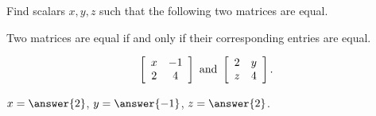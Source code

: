 \documentclass{ximera}
\author{Zack Reed}
\begin{document}
\begin{exercise}
  Find scalars $x,y,z$ such that the following two matrices are equal.

  \begin{hint}

    Two matrices are equal if and only if their corresponding entries are equal. 

  \end{hint}
  \begin{equation*}
    \startmat{cc}
      x & -1 \\
      2 & 4
    \stopmat
    \quad\mbox{and}\quad
    \startmat{cc}
      2 & y \\
      z & 4
    \stopmat.
  \end{equation*}

    $x=\answer{2}$, $y=\answer{-1}$, $z=\answer{2}$.

\end{exercise}
\end{document}
